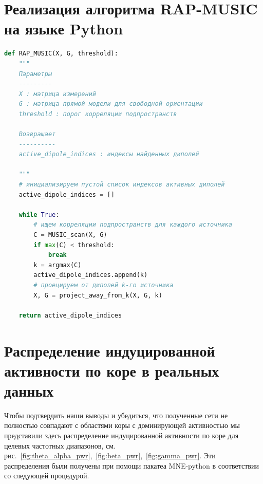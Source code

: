 \chapter{Реализация алгоритма RAP-MUSIC на языке Python}\label{appendix:rap_music_code}

\begin{ListingEnv}[!h]
    \begin{lstlisting}[language=Python,label={rap_music_listing},caption={Алгоритм RAP-MUSIC}]
def RAP_MUSIC(X, G, threshold):
    """
    Параметры
    ---------
    X : матрица измерений
    G : матрица прямой модели для свободной ориентации
    threshold : порог корреляции подпространств

    Возвращает
    ----------
    active_dipole_indices : индексы найденных диполей

    """
    # инициализируем пустой список индексов активных диполей
    active_dipole_indices = []

    while True:
        # ищем корреляции подпространств для каждого источника
        C = MUSIC_scan(X, G)
        if max(C) < threshold:
            break
        k = argmax(C)
        active_dipole_indices.append(k) 
        # проецируем от диполей k-го источника
        X, G = project_away_from_k(X, G, k) 

    return active_dipole_indices
    \end{lstlisting}
\end{ListingEnv}

\chapter{Распределение индуцированной активности по коре в реальных данных}\label{appendix:real_data_power}

Чтобы подтвердить наши выводы и убедиться, что полученные сети не
полностью совпадают с областями коры с доминирующей активностью мы
представили здесь распределение индуцированной активности по коре для целевых частотных диапазонов,
см. рис.~\ref{fig:theta_alpha_pwr},~\ref{fig:beta_pwr},~\ref{fig:gamma_pwr}.
Эти распределения были получены при помощи пакатеа MNE-python в соответствии со следующей процедурой.

